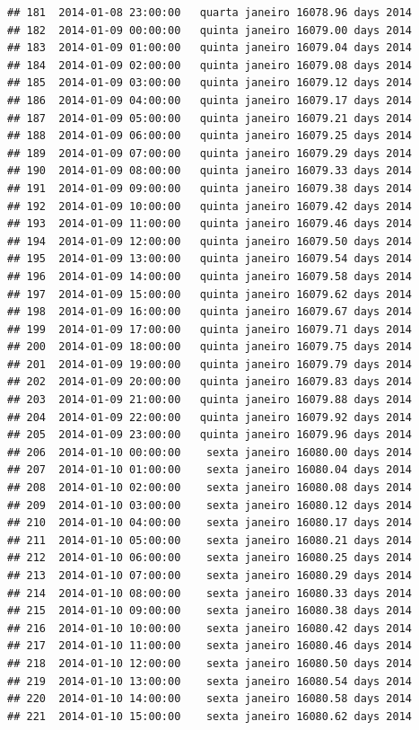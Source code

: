 \documentclass[]{book}
\begin{document}
\begin{verbatim}
## 181  2014-01-08 23:00:00   quarta janeiro 16078.96 days 2014
## 182  2014-01-09 00:00:00   quinta janeiro 16079.00 days 2014
## 183  2014-01-09 01:00:00   quinta janeiro 16079.04 days 2014
## 184  2014-01-09 02:00:00   quinta janeiro 16079.08 days 2014
## 185  2014-01-09 03:00:00   quinta janeiro 16079.12 days 2014
## 186  2014-01-09 04:00:00   quinta janeiro 16079.17 days 2014
## 187  2014-01-09 05:00:00   quinta janeiro 16079.21 days 2014
## 188  2014-01-09 06:00:00   quinta janeiro 16079.25 days 2014
## 189  2014-01-09 07:00:00   quinta janeiro 16079.29 days 2014
## 190  2014-01-09 08:00:00   quinta janeiro 16079.33 days 2014
## 191  2014-01-09 09:00:00   quinta janeiro 16079.38 days 2014
## 192  2014-01-09 10:00:00   quinta janeiro 16079.42 days 2014
## 193  2014-01-09 11:00:00   quinta janeiro 16079.46 days 2014
## 194  2014-01-09 12:00:00   quinta janeiro 16079.50 days 2014
## 195  2014-01-09 13:00:00   quinta janeiro 16079.54 days 2014
## 196  2014-01-09 14:00:00   quinta janeiro 16079.58 days 2014
## 197  2014-01-09 15:00:00   quinta janeiro 16079.62 days 2014
## 198  2014-01-09 16:00:00   quinta janeiro 16079.67 days 2014
## 199  2014-01-09 17:00:00   quinta janeiro 16079.71 days 2014
## 200  2014-01-09 18:00:00   quinta janeiro 16079.75 days 2014
## 201  2014-01-09 19:00:00   quinta janeiro 16079.79 days 2014
## 202  2014-01-09 20:00:00   quinta janeiro 16079.83 days 2014
## 203  2014-01-09 21:00:00   quinta janeiro 16079.88 days 2014
## 204  2014-01-09 22:00:00   quinta janeiro 16079.92 days 2014
## 205  2014-01-09 23:00:00   quinta janeiro 16079.96 days 2014
## 206  2014-01-10 00:00:00    sexta janeiro 16080.00 days 2014
## 207  2014-01-10 01:00:00    sexta janeiro 16080.04 days 2014
## 208  2014-01-10 02:00:00    sexta janeiro 16080.08 days 2014
## 209  2014-01-10 03:00:00    sexta janeiro 16080.12 days 2014
## 210  2014-01-10 04:00:00    sexta janeiro 16080.17 days 2014
## 211  2014-01-10 05:00:00    sexta janeiro 16080.21 days 2014
## 212  2014-01-10 06:00:00    sexta janeiro 16080.25 days 2014
## 213  2014-01-10 07:00:00    sexta janeiro 16080.29 days 2014
## 214  2014-01-10 08:00:00    sexta janeiro 16080.33 days 2014
## 215  2014-01-10 09:00:00    sexta janeiro 16080.38 days 2014
## 216  2014-01-10 10:00:00    sexta janeiro 16080.42 days 2014
## 217  2014-01-10 11:00:00    sexta janeiro 16080.46 days 2014
## 218  2014-01-10 12:00:00    sexta janeiro 16080.50 days 2014
## 219  2014-01-10 13:00:00    sexta janeiro 16080.54 days 2014
## 220  2014-01-10 14:00:00    sexta janeiro 16080.58 days 2014
## 221  2014-01-10 15:00:00    sexta janeiro 16080.62 days 2014

\end{verbatim}
\end{document}
